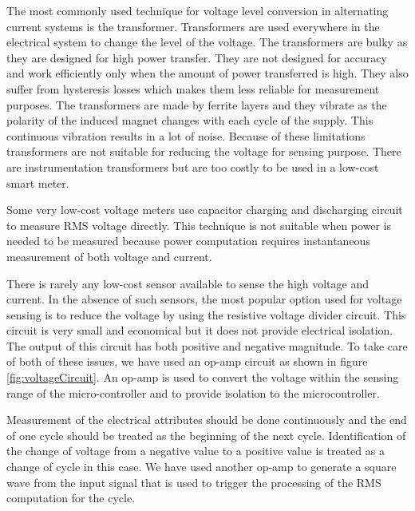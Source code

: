 The most commonly used technique for voltage level conversion in alternating current systems is the transformer. Transformers are used everywhere in the electrical system to change the level of the voltage. The transformers are bulky as they are designed for high power transfer. They are not designed for accuracy and work efficiently only when the amount of power transferred is high. They also suffer from hysteresis losses which makes them less reliable for measurement purposes. The transformers are made by ferrite layers and they vibrate as the polarity of the induced magnet changes with each cycle of the supply. This continuous vibration results in a lot of noise. Because of these limitations transformers are not suitable for reducing the voltage for sensing purpose.  There are instrumentation transformers but are too costly to be used in a low-cost smart meter.

Some very low-cost voltage meters use capacitor charging and discharging circuit to measure RMS voltage directly. This technique is not suitable when power is needed to be measured because power computation requires instantaneous measurement of both voltage and current.

There is rarely any low-cost sensor available to sense the high voltage and current. In the absence of such sensors, the most popular option used for voltage sensing is to reduce the voltage by using the resistive voltage divider circuit. This circuit is very small and economical but it does not provide electrical isolation.  The output of this circuit has both positive and negative magnitude. To take care of both of these issues, we have used an op-amp circuit as shown in figure \ref{fig:voltageCircuit}.
An op-amp is used to convert the voltage within the sensing range of the micro-controller and to provide isolation to the microcontroller.

Measurement of the electrical attributes should be done continuously and the end of one cycle should be treated as the beginning of the next cycle. Identification of the change of voltage from a negative value to a positive value is treated as a change of cycle in this case. We have used another op-amp to generate a square wave from the input signal that is used to trigger the processing of the RMS computation for the cycle.
